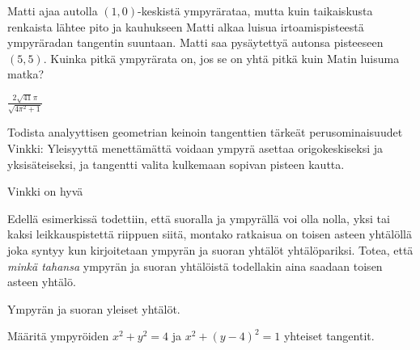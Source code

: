 \begin{tehtavasivu}
\begin{tehtava}
Matti ajaa autolla $(1,0)$-keskistä ympyrärataa, mutta kuin taikaiskusta renkaista lähtee pito ja kauhukseen Matti alkaa luisua irtoamispisteestä ympyräradan tangentin suuntaan. Matti saa pysäytettyä autonsa pisteeseen $(5,5)$. Kuinka pitkä ympyrärata on, jos se on yhtä pitkä kuin Matin luisuma matka?
\begin{vastaus}
$\frac{2\sqrt{41}\pi}{\sqrt{4\pi^2+1}}$
\end{vastaus}
\end{tehtava}

\begin{tehtava}
Todista analyyttisen geometrian keinoin tangenttien tärkeät perusominaisuudet
Vinkki: Yleisyyttä menettämättä voidaan ympyrä asettaa origokeskiseksi ja yksisäteiseksi, ja tangentti valita kulkemaan sopivan pisteen kautta.
\begin{vastaus}
Vinkki on hyvä
\end{vastaus}
\end{tehtava}

\begin{tehtava}
	\begin{vastaus}
	\end{vastaus}
\end{tehtava}


\begin{tehtava}
Edellä esimerkissä todettiin, että suoralla ja ympyrällä voi olla nolla, yksi tai kaksi leikkauspistettä riippuen siitä, montako ratkaisua on toisen asteen yhtälöllä joka syntyy kun kirjoitetaan ympyrän ja suoran yhtälöt yhtälöpariksi. Totea, että \emph{minkä tahansa} ympyrän ja suoran yhtälöistä todellakin aina saadaan toisen asteen yhtälö.
\begin{vastaus}
Ympyrän ja suoran yleiset yhtälöt.
\end{vastaus}
\end{tehtava}

\begin{tehtava}
Määritä ympyröiden $x^2+y^2 = 4$ ja $x^2+(y-4)^2 = 1$ yhteiset tangentit.


\end{tehtava}
\end{tehtavasivu}
